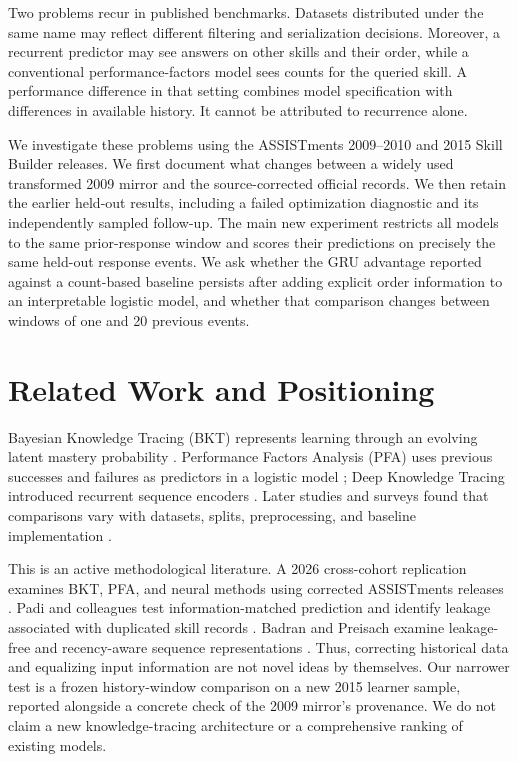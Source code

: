 \documentclass[11pt,a4paper]{article}
\begin{document}
Two problems recur in published benchmarks. Datasets distributed under the same name may reflect different filtering and serialization decisions. Moreover, a recurrent predictor may see answers on other skills and their order, while a conventional performance-factors model sees counts for the queried skill. A performance difference in that setting combines model specification with differences in available history. It cannot be attributed to recurrence alone.

We investigate these problems using the ASSISTments 2009--2010 and 2015 Skill Builder releases. We first document what changes between a widely used transformed 2009 mirror and the source-corrected official records. We then retain the earlier held-out results, including a failed optimization diagnostic and its independently sampled follow-up. The main new experiment restricts all models to the same prior-response window and scores their predictions on precisely the same held-out response events. We ask whether the GRU advantage reported against a count-based baseline persists after adding explicit order information to an interpretable logistic model, and whether that comparison changes between windows of one and 20 previous events.

\section{Related Work and Positioning}
Bayesian Knowledge Tracing (BKT) represents learning through an evolving latent mastery probability \citep{corbett1995}. Performance Factors Analysis (PFA) uses previous successes and failures as predictors in a logistic model \citep{pavlik2009}; Deep Knowledge Tracing introduced recurrent sequence encoders \citep{piech2015}. Later studies and surveys found that comparisons vary with datasets, splits, preprocessing, and baseline implementation \citep{gervet2020,abdelrahman2023}.

This is an active methodological literature. A 2026 cross-cohort replication examines BKT, PFA, and neural methods using corrected ASSISTments releases \citep{polydoros2026}. Padi and colleagues test information-matched prediction and identify leakage associated with duplicated skill records \citep{padi2026}. Badran and Preisach examine leakage-free and recency-aware sequence representations \citep{badran2026}. Thus, correcting historical data and equalizing input information are not novel ideas by themselves. Our narrower test is a frozen history-window comparison on a new 2015 learner sample, reported alongside a concrete check of the 2009 mirror's provenance. We do not claim a new knowledge-tracing architecture or a comprehensive ranking of existing models.
\end{document}
